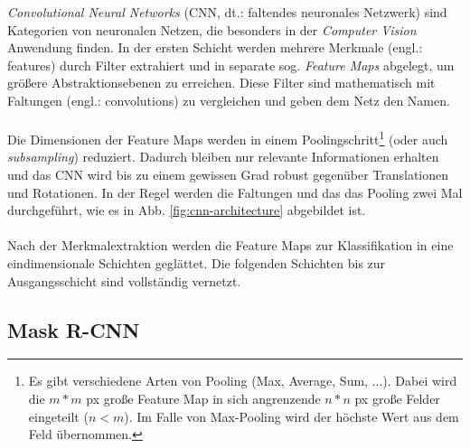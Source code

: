 \noindent 
\textit{Convolutional Neural Networks} (CNN, dt.: faltendes neuronales Netzwerk) sind Kategorien von neuronalen Netzen, die besonders in der \textit{Computer Vision} Anwendung finden. In der ersten Schicht werden mehrere Merkmale (engl.: features) durch Filter extrahiert und in separate sog. \textit{Feature Maps} abgelegt, um größere Abstraktionsebenen zu erreichen. Diese Filter sind mathematisch mit Faltungen (engl.: convolutions) zu vergleichen und geben dem Netz den Namen. 
\\\\
Die Dimensionen der Feature Maps werden in einem Poolingschritt\footnote{Es gibt verschiedene Arten von Pooling (Max, Average, Sum, ...). Dabei wird die $m*m$ px große Feature Map in sich angrenzende $n*n$ px große Felder eingeteilt ($n<m$). Im Falle von Max-Pooling wird der höchste Wert aus dem Feld übernommen.} (oder auch \textit{subsampling}) reduziert. Dadurch bleiben nur relevante Informationen erhalten und das CNN wird bis zu einem gewissen Grad robust gegenüber Translationen und Rotationen. In der Regel werden die Faltungen und das das Pooling zwei Mal durchgeführt, wie es in Abb. \ref{fig:cnn-architecture} abgebildet ist.
\\\\
Nach der Merkmalextraktion werden die Feature Maps zur Klassifikation in eine eindimensionale Schichten geglättet. Die folgenden Schichten bis zur Ausgangsschicht sind vollständig vernetzt.


\subsection{Mask R-CNN}\label{sec:sub:mask-rcnn}

